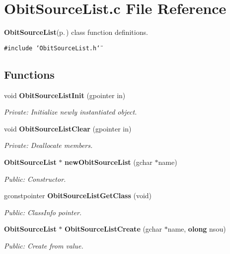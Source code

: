 \section{Obit\-Source\-List.c File Reference}
\label{ObitSourceList_8c}
{\bf Obit\-Source\-List}{\rm (p.\,\pageref{structObitSourceList})} class function definitions. 

{\tt \#include \char`\"{}Obit\-Source\-List.h\char`\"{}}\par
\subsection*{Functions}
\begin{CompactItemize}
\item 
void {\bf Obit\-Source\-List\-Init} (gpointer in)
\begin{CompactList}\small\item\em Private: Initialize newly instantiated object. \item\end{CompactList}\item 
void {\bf Obit\-Source\-List\-Clear} (gpointer in)
\begin{CompactList}\small\item\em Private: Deallocate members. \item\end{CompactList}\item 
{\bf Obit\-Source\-List} $\ast$ {\bf new\-Obit\-Source\-List} (gchar $\ast$name)
\begin{CompactList}\small\item\em Public: Constructor. \item\end{CompactList}\item 
gconstpointer {\bf Obit\-Source\-List\-Get\-Class} (void)
\begin{CompactList}\small\item\em Public: Class\-Info pointer. \item\end{CompactList}\item 
{\bf Obit\-Source\-List} $\ast$ {\bf Obit\-Source\-List\-Create} (gchar $\ast$name, {\bf olong} nsou)
\begin{CompactList}\small\item\em Public: Create from value. \item\end{CompactList}\item 

\end{CompactItemize}
